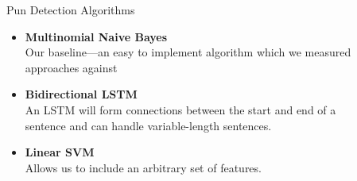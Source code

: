 \documentclass[final]{beamer}
\newlength{\sepwid}
\newlength{\onecolwid}
\newlength{\twocolwid}
\begin{document}
\begin{frame}[t]
\begin{columns}[t]
\begin{column}{\twocolwid}
\begin{columns}[t,totalwidth=\twocolwid]
\begin{column}{\onecolwid}
\begin{block}{Pun Detection Algorithms}
{\begin{itemize}
								\item {\textbf{Multinomial Naive Bayes}\\
									Our baseline---an easy to implement algorithm which we measured approaches against
								}
								\item {\textbf{Bidirectional LSTM}\\
									An LSTM will form connections between the start and end of a sentence and can handle variable-length sentences.
								}
								\item {\textbf{Linear SVM}\\ 
									Allows us to include an arbitrary set of features.
								}
							\end{itemize}
						}
					\end{block}
				\end{column}
				\begin{column}{\sepwid}\end{column}
				\begin{column}{\onecolwid}\vspace{-.6in}
				

\end{column}
\end{columns}
\end{column}
\end{columns}
\end{frame}
\end{document}
